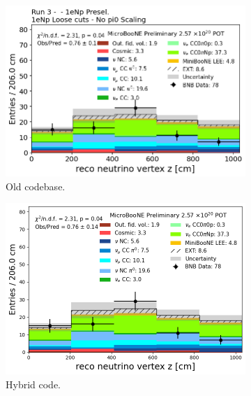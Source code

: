\begin{figure}[H]
    \centering
    \begin{subfigure}[t]{0.32\linewidth}
        \includegraphics[width=\linewidth]{technote/Appendix_Validation/Figures/1eNp_Loose/Run3_Vertex_Z_Old.png}
        \caption{Old codebase.}
    \end{subfigure}%
    \hspace{0.2cm}%
    \begin{subfigure}[t]{0.32\linewidth}
        \includegraphics[width=\linewidth]{technote/Appendix_Validation/Figures/1eNp_Loose/Run3_Vertex_Z_Chris.png}
        \caption{Hybrid code.}
    \end{subfigure}%
    \hspace{0.2cm}%
    \begin{subfigure}[t]{0.32\linewidth}

\end{subfigure}
\end{figure}

